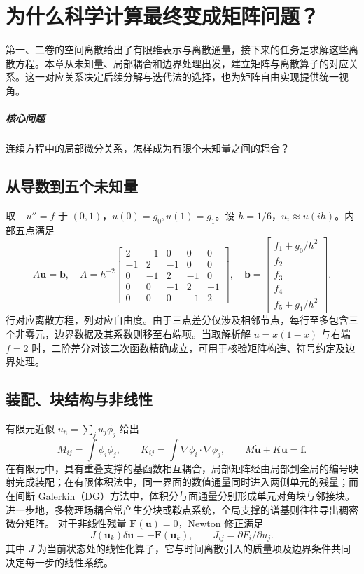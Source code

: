 \chapter{为什么科学计算最终变成矩阵问题？}\label{v0ch:1}
\begin{chaptersummary}
第一、二卷的空间离散给出了有限维表示与离散通量，接下来的任务是求解这些离散方程。本章从未知量、局部耦合和边界处理出发，建立矩阵与离散算子的对应关系。这一对应关系决定后续分解与迭代法的选择，也为矩阵自由实现提供统一视角。
\end{chaptersummary}
\paragraph{核心问题}连续方程中的局部微分关系，怎样成为有限个未知量之间的耦合？

\section{从导数到五个未知量}
取 $-u''=f$ 于 $(0,1)$，$u(0)=g_0,u(1)=g_1$。设 $h=1/6$，$u_i\approx u(ih)$。内部五点满足
\[
 A\bm u=\bm b,\quad
 A=h^{-2}\begin{bmatrix}
 2&-1&0&0&0\\-1&2&-1&0&0\\0&-1&2&-1&0\\
 0&0&-1&2&-1\\0&0&0&-1&2
 \end{bmatrix},\quad
 \bm b=\begin{bmatrix}f_1+g_0/h^2\\f_2\\f_3\\f_4\\f_5+g_1/h^2\end{bmatrix}.
\]
行对应离散方程，列对应自由度。由于三点差分仅涉及相邻节点，每行至多包含三个非零元，边界数据及其系数则移至右端项。当取解析解 $u=x(1-x)$ 与右端 $f=2$ 时，二阶差分对该二次函数精确成立，可用于核验矩阵构造、符号约定及边界处理。
\section{装配、块结构与非线性}
有限元近似 $u_h=\sum_j u_j\phi_j$ 给出
\[
 M_{ij}=\int\phi_i\phi_j,\qquad
 K_{ij}=\int\nabla\phi_i\cdot\nabla\phi_j,\qquad
 M\dot{\bm u}+K\bm u=\bm f.
\]
在有限元中，具有重叠支撑的基函数相互耦合，局部矩阵经由局部到全局的编号映射完成装配；在有限体积法中，同一界面的数值通量同时进入两侧单元的残量；而在间断 Galerkin（DG）方法中，体积分与面通量分别形成单元对角块与邻接块。进一步地，多物理场耦合常产生分块或鞍点系统，全局支撑的谱基则往往导出稠密微分矩阵。
对于非线性残量 $\bm F(\bm u)=0$，Newton 修正满足
\[
 J(\bm u_k)\delta\bm u=-\bm F(\bm u_k),\qquad J_{ij}=\partial F_i/\partial u_j.
\]
其中 $J$ 为当前状态处的线性化算子，它与时间离散引入的质量项及边界条件共同决定每一步的线性系统。
